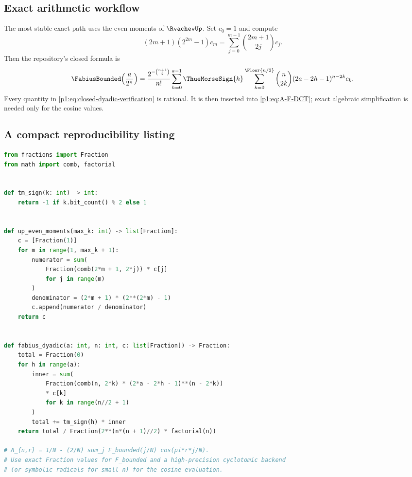 \documentclass[11pt,oneside]{article}
\theoremstyle{definition}
\theoremstyle{remark}
\begin{document}
\subsection{Exact arithmetic workflow}

The most stable exact path uses the even moments of $\RvachevUp$.  Set $c_0=1$ and
compute
\begin{equation}\label{p1:eq:c-recurrence-verification}
 (2m+1)(2^{2m}-1)c_m
 =\sum_{j=0}^{m-1}\binom{2m+1}{2j}c_j.
\end{equation}
Then the repository's closed formula is
\begin{equation}\label{p1:eq:closed-dyadic-verification}
 \FabiusBounded\!\left(\frac a{2^n}\right)
 =\frac{2^{-\binom{n+1}{2}}}{n!}
 \sum_{h=0}^{a-1}\ThueMorseSign{h}
 \sum_{k=0}^{\Floor{n/2}}
 \binom n{2k}(2a-2h-1)^{n-2k}c_k.
\end{equation}
Every quantity in \eqref{p1:eq:closed-dyadic-verification} is rational.  It is
then inserted into \eqref{p1:eq:A-F-DCT}; exact algebraic simplification is needed
only for the cosine values.

\subsection{A compact reproducibility listing}

\begin{lstlisting}[style=pseudo,language=Python,caption={Core exact computation used for the tables.}]
from fractions import Fraction
from math import comb, factorial


def tm_sign(k: int) -> int:
    return -1 if k.bit_count() % 2 else 1


def up_even_moments(max_k: int) -> list[Fraction]:
    c = [Fraction(1)]
    for m in range(1, max_k + 1):
        numerator = sum(
            Fraction(comb(2*m + 1, 2*j)) * c[j]
            for j in range(m)
        )
        denominator = (2*m + 1) * (2**(2*m) - 1)
        c.append(numerator / denominator)
    return c


def fabius_dyadic(a: int, n: int, c: list[Fraction]) -> Fraction:
    total = Fraction(0)
    for h in range(a):
        inner = sum(
            Fraction(comb(n, 2*k) * (2*a - 2*h - 1)**(n - 2*k))
            * c[k]
            for k in range(n//2 + 1)
        )
        total += tm_sign(h) * inner
    return total / Fraction(2**(n*(n + 1)//2) * factorial(n))

# A_{n,r} = 1/N - (2/N) sum_j F_bounded(j/N) cos(pi*r*j/N).
# Use exact Fraction values for F_bounded and a high-precision cyclotomic backend
# (or symbolic radicals for small n) for the cosine evaluation.
\end{lstlisting}
\end{document}
